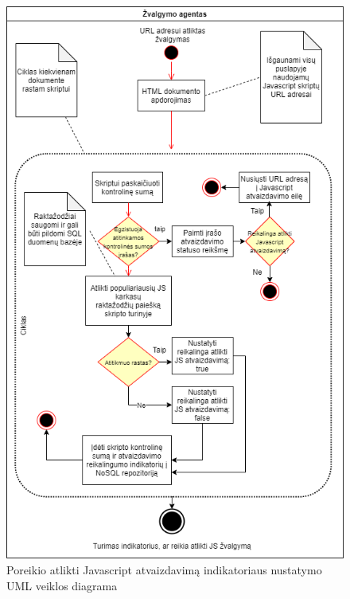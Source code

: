 \begin{figure}[ht!]
\centering
\includegraphics[scale=0.6]{img/javascript_rendering_condition_activity_diagram.png}
\caption{Poreikio atlikti Javascript atvaizdavimą indikatoriaus nustatymo UML veiklos diagrama}
\label{fig:js_rendering_condition}
\end{figure}